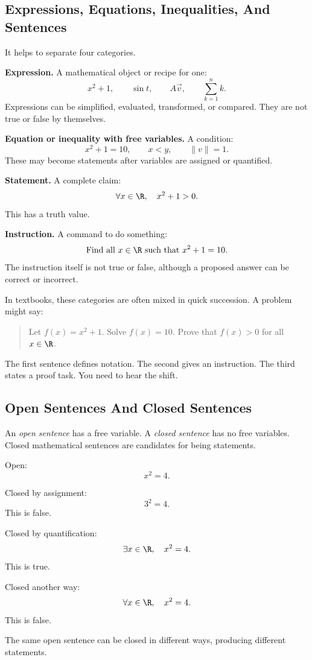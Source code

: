 \subsection{Expressions, Equations, Inequalities, And Sentences}

It helps to separate four categories.

\textbf{Expression.} A mathematical object or recipe for one:
\[
x^2+1,\qquad \sin t,\qquad A\vec v,\qquad \sum_{k=1}^{n}k.
\]
Expressions can be simplified, evaluated, transformed, or compared. They are not true or false by themselves.

\textbf{Equation or inequality with free variables.} A condition:
\[
x^2+1=10,\qquad x<y,\qquad \|v\|=1.
\]
These may become statements after variables are assigned or quantified.

\textbf{Statement.} A complete claim:
\[
\forall x\in\R,\quad x^2+1>0.
\]
This has a truth value.

\textbf{Instruction.} A command to do something:
\[
\text{Find all }x\in\R\text{ such that }x^2+1=10.
\]
The instruction itself is not true or false, although a proposed answer can be correct or incorrect.

In textbooks, these categories are often mixed in quick succession. A problem might say:

\begin{quote}
Let $f(x)=x^2+1$. Solve $f(x)=10$. Prove that $f(x)>0$ for all $x\in\R$.
\end{quote}

The first sentence defines notation. The second gives an instruction. The third states a proof task. You need to hear the shift.

\subsection{Open Sentences And Closed Sentences}

An \emph{open sentence} has a free variable. A \emph{closed sentence} has no free variables. Closed mathematical sentences are candidates for being statements.

Open:
\[
x^2=4.
\]

Closed by assignment:
\[
3^2=4.
\]
This is false.

Closed by quantification:
\[
\exists x\in\R,\quad x^2=4.
\]
This is true.

Closed another way:
\[
\forall x\in\R,\quad x^2=4.
\]
This is false.

The same open sentence can be closed in different ways, producing different statements.

